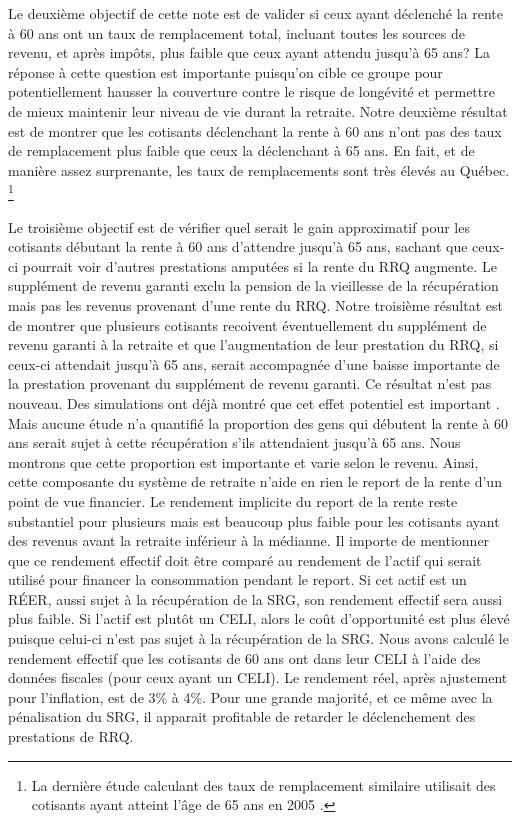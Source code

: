 \documentclass[french, 12pt]{article}
\begin{document}
	Le deuxième objectif de cette note est de valider si ceux ayant déclenché la rente à 60 ans ont un taux de remplacement total, incluant toutes les sources de revenu, et après impôts, plus faible que ceux ayant attendu jusqu’à 65 ans? La réponse à cette question est importante puisqu’on cible ce groupe pour potentiellement hausser la couverture contre le risque de longévité et permettre de mieux maintenir leur niveau de vie durant la retraite. Notre deuxième résultat est de montrer que les cotisants déclenchant la rente à 60 ans n'ont pas des taux de remplacement plus faible que ceux la déclenchant à 65 ans. En fait, et de manière assez surprenante, les taux de remplacements sont très élevés au Québec. \footnote{La dernière étude calculant des taux de remplacement similaire utilisait des cotisants ayant atteint l'âge de 65 ans en 2005 \citep{ostrovsky2010}.}  
	
    Le troisième objectif est de vérifier quel serait le gain approximatif pour les cotisants débutant la rente à 60 ans d'attendre jusqu'à 65 ans, sachant que ceux-ci pourrait voir d'autres prestations amputées si la rente du RRQ augmente. Le supplément de revenu garanti exclu la pension de la vieillesse de la récupération mais pas les revenus provenant d'une rente du RRQ. Notre troisième résultat est de montrer que plusieurs cotisants recoivent éventuellement du supplément de revenu garanti à
    la retraite et que l'augmentation de leur prestation du RRQ, si ceux-ci attendait jusqu'à 65 ans, serait accompagnée d'une baisse importante de la prestation provenant du supplément de revenu garanti. Ce résultat n'est pas nouveau. Des simulations ont déjà montré que cet effet potentiel est important \citep{milliganschirle202, michaud2020, laverdiere2023}.  Mais aucune étude n'a quantifié la proportion des gens qui débutent la rente à 60 ans serait sujet à cette récupération s'ils attendaient jusqu'à 65 ans. Nous montrons que cette proportion est importante et varie selon le revenu. Ainsi, cette composante du système de retraite n'aide en rien le report de la rente d'un point de vue financier. Le rendement implicite du report de la rente reste substantiel pour plusieurs mais est beaucoup plus faible pour les cotisants ayant des revenus avant la retraite
    inférieur à la médianne.  Il importe de mentionner que ce rendement effectif doit être comparé au rendement de l'actif qui serait utilisé pour financer la consommation pendant le report. Si cet actif est un RÉER, aussi sujet à la récupération de la SRG, son rendement effectif sera aussi plus faible. Si l'actif est plutôt un CELI, alors le coût d'opportunité est plus élevé puisque celui-ci n'est pas sujet à la récupération de la SRG. Nous avons calculé le rendement effectif que les cotisants de 60 ans ont dans leur CELI à l'aide des données fiscales (pour ceux ayant un CELI). Le rendement réel, après ajustement pour l'inflation, est de 3\% à 4\%.  Pour une grande majorité, et ce même avec la pénalisation du SRG, il apparait profitable de retarder le déclenchement des prestations de RRQ. 
   
\end{document}
